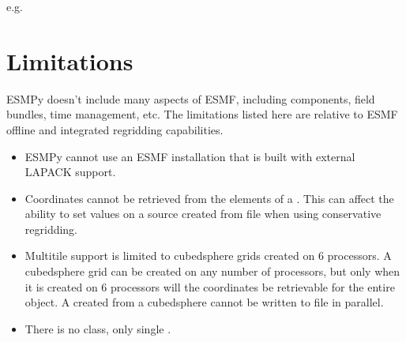 \documentclass[letterpaper,10pt,english]{sphinxmanual}
\begin{document}
\begin{sphinxVerbatim}[commandchars=\\\{\}]
 
\end{sphinxVerbatim}

e.g.

\begin{sphinxVerbatim}[commandchars=\\\{\}]
 
\end{sphinxVerbatim}


\section{Limitations}
\label{\detokenize{install:limitations}}
ESMPy doesn’t include many aspects of ESMF, including components, field bundles,
time management, etc.  The limitations listed here are relative
to ESMF offline and integrated regridding capabilities.
\begin{itemize}
\item {} 
ESMPy cannot use an ESMF installation that is built with external LAPACK
support.

\item {} 
Coordinates cannot be retrieved from the elements of a
{\hyperref[\detokenize{mesh:ESMF.api.mesh.Mesh}]{}}. This can affect the ability to set
{\hyperref[\detokenize{field:ESMF.api.field.Field}]{}} values on a source {\hyperref[\detokenize{mesh:ESMF.api.mesh.Mesh}]{}}
created from file when using conservative regridding.

\item {} 
Multi\sphinxhyphen{}tile {\hyperref[\detokenize{grid:ESMF.api.grid.Grid}]{}} support is limited to cubed\sphinxhyphen{}sphere
grids created on 6 processors. A cubed\sphinxhyphen{}sphere grid can be created on any
number of processors, but only when it is created on 6 processors will the
coordinates be retrievable for the entire object. A
{\hyperref[\detokenize{field:ESMF.api.field.Field}]{}} created from a cubed\sphinxhyphen{}sphere
{\hyperref[\detokenize{grid:ESMF.api.grid.Grid}]{}} cannot be written to file in parallel.

\item {} 
There is no  class, only single {\hyperref[\detokenize{field:ESMF.api.field.Field}]{}}.

\end{itemize}
\end{document}
